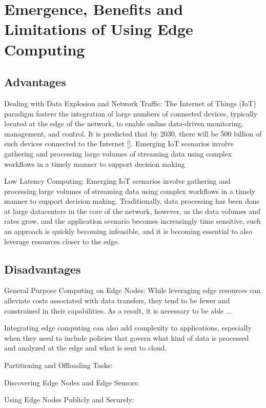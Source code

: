 \section{Emergence, Benefits and Limitations of Using Edge Computing}

\subsection{Advantages}

Dealing with Data Explosion and Network Traffic: The Internet of Things (IoT) paradigm fosters the integration of large numbers of connected devices, typically located at the edge of the network, to enable online data-driven monitoring, management, and control. It is predicted that by 2030, there will be 500 billion of such devices connected to the Internet []. Emerging IoT scenarios involve gathering and processing large volumes of streaming data using complex workflows in a timely manner to support decision making

Low Latency Computing: Emerging IoT scenarios involve gathering and processing large volumes of streaming data using complex workflows in a timely manner to support decision making. Traditionally, data processing has been done at large datacenters in the core of the network, however, as the data volumes and rates grow, and the application scenario becomes increasingly time sensitive, such an approach is quickly becoming infeasible, and it is becoming essential to also leverage resources closer to the edge.

\subsection{Disadvantages}
General Purpose Computing on Edge Nodes: While leveraging edge resources can alleviate costs associated with data
transfers, they tend to be fewer and constrained in their capabilities. As a result, it is necessary to be able ...

Integrating edge computing can also add complexity to applications, especially when they need to include policies that govern what kind of data is processed and analyzed at the edge and what is sent to cloud.

Partitioning and Offloading Tasks:

Discovering Edge Nodes and Edge Sensors:

Using Edge Nodes Publicly and Securely:

